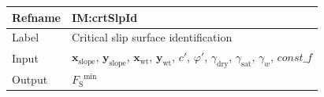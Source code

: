 \documentclass[12pt]{article}
\begin{document}
\medskip
\noindent
\begin{minipage}{\textwidth}
\begin{tabular}{>{\raggedright}p{}>{\raggedright\arraybackslash}p{}}
\toprule \textbf{Refname} & \textbf{IM:crtSlpId}
\label{IM:crtSlpId}
\\ \midrule
Label & Critical slip surface identification
        
\\ \midrule
Input & ${\symbf{x}_{\text{slope}}}$, ${\symbf{y}_{\text{slope}}}$, ${\symbf{x}_{\text{wt}}}$, ${\symbf{y}_{\text{wt}}}$, $c'$, $φ'$, ${γ_{\text{dry}}}$, ${γ_{\text{sat}}}$, ${γ_{w}}$, $\mathit{const\_f}$
        
\\ \midrule
Output & ${{F_{\text{S}}}^{\text{min}}}$
         

\end{tabular}
\end{minipage}
\end{document}
